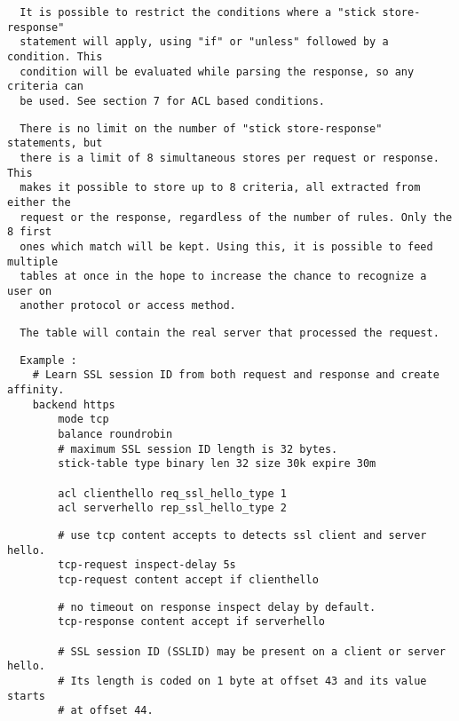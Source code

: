 \begin{verbatim}
  It is possible to restrict the conditions where a "stick store-response"
  statement will apply, using "if" or "unless" followed by a condition. This
  condition will be evaluated while parsing the response, so any criteria can
  be used. See section 7 for ACL based conditions.
\end{verbatim}

\begin{verbatim}
  There is no limit on the number of "stick store-response" statements, but
  there is a limit of 8 simultaneous stores per request or response. This
  makes it possible to store up to 8 criteria, all extracted from either the
  request or the response, regardless of the number of rules. Only the 8 first
  ones which match will be kept. Using this, it is possible to feed multiple
  tables at once in the hope to increase the chance to recognize a user on
  another protocol or access method.
\end{verbatim}

\begin{verbatim}
  The table will contain the real server that processed the request.
\end{verbatim}

\begin{verbatim}
  Example :
    # Learn SSL session ID from both request and response and create affinity.
    backend https
        mode tcp
        balance roundrobin
        # maximum SSL session ID length is 32 bytes.
        stick-table type binary len 32 size 30k expire 30m
        
        acl clienthello req_ssl_hello_type 1
        acl serverhello rep_ssl_hello_type 2
\end{verbatim}

\begin{verbatim}
        # use tcp content accepts to detects ssl client and server hello.
        tcp-request inspect-delay 5s
        tcp-request content accept if clienthello
\end{verbatim}

\begin{verbatim}
        # no timeout on response inspect delay by default.
        tcp-response content accept if serverhello
 
        # SSL session ID (SSLID) may be present on a client or server hello.
        # Its length is coded on 1 byte at offset 43 and its value starts
        # at offset 44.
\end{verbatim}

